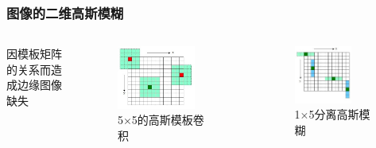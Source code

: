 \documentclass[presentation,aspectratio=1610]{beamer}
\begin{document}
\begin{frame}
	\frametitle{图像的二维高斯模糊}
	\begin{columns}
		因模板矩阵的关系而造成边缘图像缺失
		
		\begin{figure}[htbp!]
			\centering
			\includegraphics[width=0.8\textwidth]{img/filter1.jpg}
			\caption{5$\times $5的高斯模板卷积}
		\end{figure}	\pause
		\begin{figure}[htbp!]
			\centering
			\includegraphics[width=0.7\textwidth]{img/filter2.jpg}
			\caption{1$\times$5分离高斯模糊}
		\end{figure}
		
	\end{columns}	
\end{frame}
\end{document}
